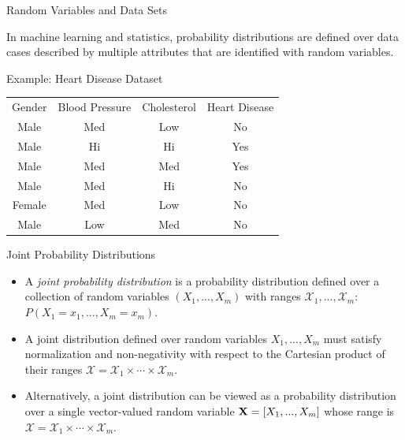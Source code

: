 \documentclass[serif,xcolor=pdftex,dvipsnames,table,hyperref={bookmarks=false,breaklinks}]{beamer}
\begin{document}
\begin{frame}[t]{Random Variables and Data Sets}

In machine learning and statistics, probability distributions are defined over data cases described by multiple attributes that are identified with random variables. 

 \pause 
 \begin{block}{Example: Heart Disease Dataset}
  \centering
  \begin{tabular}{cccc}
    \rowcolor{gray!50}
     Gender & Blood Pressure & Cholesterol  & Heart Disease\\
     Male&Med&Low&No\\
     Male&Hi&Hi&Yes\\
     Male&Med&Med&Yes\\
     Male&Med&Hi&No\\
     Female&Med&Low&No\\
     Male&Low&Med&No
  \end{tabular}
  \end{block}

\end{frame}



\begin{frame}[t]{Joint Probability Distributions}

\begin{itemize}
\item A \emph{joint probability distribution} is a probability distribution defined over a collection of random variables $(X_1,...,X_m)$ with ranges $\mathcal{X}_1,...,\mathcal{X}_m$: $P(X_1=x_1,...,X_m=x_m)$.

\pause
\item A joint distribution defined over random variables $X_1,...,X_m$ must satisfy normalization and non-negativity with respect to the Cartesian product of their ranges   $\mathcal{X}=\mathcal{X}_1\times \cdots \times \mathcal{X}_m$.

\pause
\item Alternatively, a joint distribution can be viewed as a probability distribution over a single vector-valued random variable ${\mathbf{X}}=[X_1,...,X_m]$ whose range is $\mathcal{X}=\mathcal{X}_1\times \cdots \times \mathcal{X}_m$. 
\end{itemize}
\end{frame}
\end{document}
